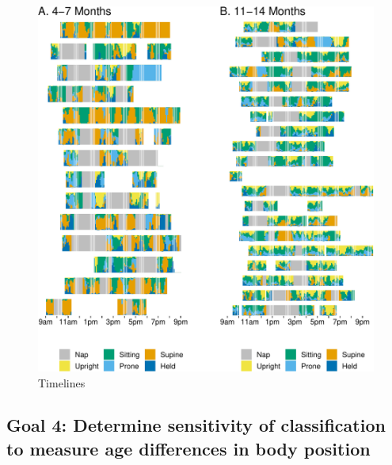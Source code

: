 \documentclass[
  man]{apa6}
\begin{document}
\begin{figure}

{\centering \includegraphics{manuscript_files/figure-latex/timelines-1} 

}

\caption{Timelines}\label{fig:timelines}
\end{figure}

\hypertarget{goal-4-determine-sensitivity-of-classification-to-measure-age-differences-in-body-position}{%
\subsection{Goal 4: Determine sensitivity of classification to measure age differences in body position}\label{goal-4-determine-sensitivity-of-classification-to-measure-age-differences-in-body-position}}
\end{document}
